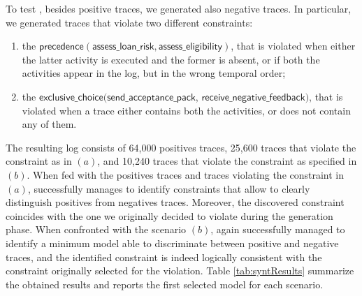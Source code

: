 To test \nd, besides positive traces, we generated also negative traces. In particular, we generated traces that violate two different constraints:
\begin{enumerate}[label=(\textit{\alph*})]
\item the $\mathsf{precedence(assess\_loan\_risk, assess\_eligibility)}$, that is violated when either the latter activity is executed and the former is absent, or if both the activities appear in the log, but in the wrong temporal order;
%
\item the $\mathsf{exclusive\_choice(send\_acceptance\_pack}$, $\mathsf{receive\_negative\_feedback)}$, that is violated when a trace either contains both the activities, or does not contain any of them.
\end{enumerate}
%
The resulting log consists of 64,000 positives traces, 25,600 traces that violate the constraint as in $(a)$, and 10,240 traces that violate the constraint as specified in $(b)$.
%
When fed with the positives traces and traces violating the constraint in $(a)$, \nd successfully manages to identify constraints that allow to clearly distinguish positives from negatives traces. Moreover, the discovered constraint coincides with the one we originally decided to violate during the generation phase. When confronted with the scenario $(b)$, \nd again successfully managed to identify a minimum model able to discriminate between positive and negative traces, and the identified constraint is indeed logically consistent with the constraint originally selected for the violation.
Table \ref{tab:syntResults} summarize the obtained results and reports the first selected model for each scenario.

